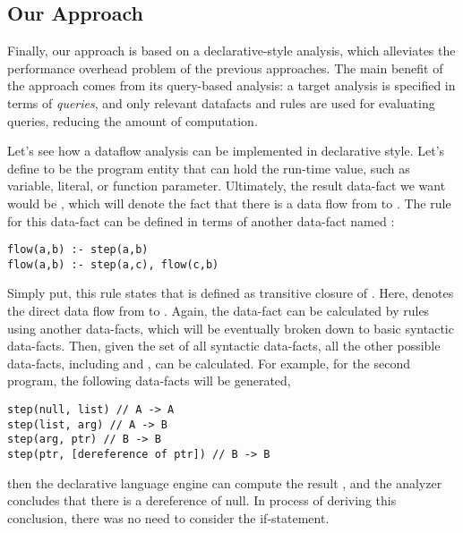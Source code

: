 \subsection{Our Approach}

Finally, our approach is based on a declarative-style analysis, which
alleviates the performance overhead problem of the previous approaches.
The main benefit of the approach comes from its query-based analysis:
a target analysis is
specified in terms of \textit{queries}, and only relevant datafacts and rules
are used for evaluating queries, reducing the amount of computation.

  Let's see how a dataflow analysis can be implemented in declarative style.
  Let's define  to be the program entity that can hold the run-time
value, such as variable, literal, or function parameter.
  Ultimately, the result data-fact we want would be , which will denote the
fact that there is a data flow from  to .
  The rule for this data-fact can be defined in terms of another data-fact named :


\begin{lstlisting}[style=myDatalog,xleftmargin=2.5em]
flow(a,b) :- step(a,b)
flow(a,b) :- step(a,c), flow(c,b)
\end{lstlisting}

Simply put, this rule states that  is defined as transitive
closure of .  Here,  denotes the direct data
flow from  to . Again, the data-fact
 can be calculated by rules using another data-facts, which will
be eventually broken down to basic syntactic data-facts.  Then, given the set
of all syntactic data-facts, all the other possible data-facts, including
 and , can be calculated. For example, for the
second program, the following data-facts will be generated,

\begin{lstlisting}[style=myDatalog,xleftmargin=2.5em]
step(null, list) // A -> A
step(list, arg) // A -> B
step(arg, ptr) // B -> B
step(ptr, [dereference of ptr]) // B -> B
\end{lstlisting}

then the declarative language engine can compute the result , and the analyzer concludes that there is a dereference
of null. In process of deriving this conclusion, there was no need to consider
the if-statement.

